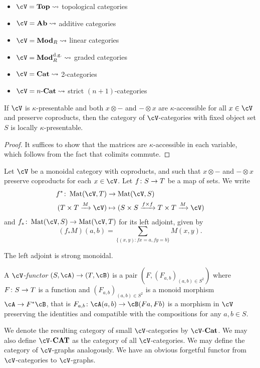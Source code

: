 \documentclass[a4paper,11pt,oneside,openany]{scrbook}
\begin{document}
\begin{exmp}
	\begin{itemize}
		\item $\cV= \Top \leadsto $ topological categories
		\item $\cV= \Ab \leadsto $ additive categories
		\item $\cV= \Mod_R \leadsto $ linear categories
		\item $\cV= \Mod_R^{\text{d.g.}} \leadsto $ graded categories
		\item $\cV= \Cat \leadsto $ 2-categories
		\item $\cV= n\text{-}\Cat \leadsto $ strict $ (n+1) $-categories
	\end{itemize}
\end{exmp}
\begin{prop}
	If $\cV$ is $\kappa$-presentable and both $ x\otimes - $ and $ - \otimes x $ are $ \kappa $-accessible for all $ x\in \cV $ and preserve coproducts, then the category of $\cV$-categories with fixed object set $ S $ is locally $ \kappa $-presentable.
\end{prop}
\begin{proof}
	It suffices to show that the matrices are $ \kappa $-accessible in each variable, which follows from the fact that colimits commute.
\end{proof}
\begin{defn}
	Let $\cV$ be a monoidal category with coproducts, and such that $
		x\otimes - $ and $ - \otimes x $ preserve coproducts for each $ x \in\cV$.
	Let $ f \colon S \to T $ be a map of sets.
	We write
	\begin{align*}
		f^* \from \Mat(\cV ,T)          & \to \Mat(\cV, S)                                                            \\
		( T\times T \xrightarrow{M}\cV) & \mapsto ( S\times S \xrightarrow{f \times  f} T\times T \xrightarrow{M}\cV)
	\end{align*}
	and $ f_* \from \Mat(\cV,S)\to \Mat(\cV,T) $ for its left adjoint, given by
	\begin{displaymath}
		(f_* M)(a,b) = \sum_{\{(x,y)\colon fx = a, fy = b \} }M(x,y).
	\end{displaymath}
\end{defn}
\begin{prop}
	The left adjoint is strong monoidal.
\end{prop}
\begin{defn}
	A $\cV$\emph{-functor} $ (S,\cA) \to (T,\cB) $ is a pair
	$ (F, (F_{a,b})_{(a,b) \in S^2}) $ where $ F\colon S \to T $ is a function
    and $ (F_{a,b})_{(a,b) \in S^2} $ is a monoid morphism $ \cA \to F^*\cB $,
    that is $ F_{a,b}\from \cA (a,b) \to \cB (Fa,Fb) $ is a morphism in $\cV$
    preserving the identities and compatible with the compositions for any $ a,b \in S $.

	We denote the resulting category of small $\cV$-categories by $\cV$-$ {\normalfont\textbf{Cat}} $. We may also define $\cV$-$ {\normalfont\textbf{CAT}} $ as the category of all $\cV$-categories.
	We may define the category of $\cV$-graphs analogously. We have an
	obvious forgetful functor from $\cV$-categories to $\cV$-graphs.
\end{defn}
\end{document}
